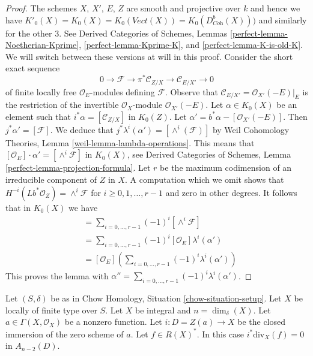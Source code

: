 \begin{proof}
The schemes $X$, $X'$, $E$, $Z$ are smooth and projective over
$k$ and hence we have $K'_0(X) = K_0(X) = K_0(\textit{Vect}(X)) =
K_0(D^b_{\textit{Coh}}(X)))$
and similarly for the other $3$. See
Derived Categories of Schemes, Lemmas \ref{perfect-lemma-Noetherian-Kprime},
\ref{perfect-lemma-Kprime-K}, and \ref{perfect-lemma-K-is-old-K}.
We will switch between these versions at will in this proof.
Consider the short exact sequence
$$
0 \to \mathcal{F} \to \pi^*\mathcal{C}_{Z/X} \to \mathcal{C}_{E/X'} \to 0
$$
of finite locally free $\mathcal{O}_E$-modules defining $\mathcal{F}$.
Observe that $\mathcal{C}_{E/X'} = \mathcal{O}_{X'}(-E)|_E$
is the restriction of the invertible $\mathcal{O}_X$-module
$\mathcal{O}_{X'}(-E)$.
Let $\alpha \in K_0(X)$ be an element such that
$i^*\alpha = [\mathcal{C}_{Z/X}]$ in $K_0(Z)$.
Let $\alpha' = b^*\alpha - [\mathcal{O}_{X'}(-E)]$.
Then $j^*\alpha' = [\mathcal{F}]$. We deduce that
$j^*\lambda^i(\alpha') = [\wedge^i(\mathcal{F})]$ by
Weil Cohomology Theories, Lemma \ref{weil-lemma-lambda-operations}.
This means that $[\mathcal{O}_E] \cdot \alpha' = [\wedge^i\mathcal{F}]$
in $K_0(X)$, see
Derived Categories of Schemes, Lemma \ref{perfect-lemma-projection-formula}.
Let $r$ be the maximum codimension of an irreducible component of $Z$
in $X$. A computation which we omit shows that
$H^{-i}(Lb^*\mathcal{O}_Z) = \wedge^i\mathcal{F}$
for $i \geq 0, 1, \ldots, r - 1$ and zero in other degrees.
It follows that in $K_0(X)$ we have
\begin{align*}
[Lb^*\mathcal{O}_Z] & =
\sum\nolimits_{i = 0, \ldots, r - 1} (-1)^i[\wedge^i\mathcal{F}] \\
& =
\sum\nolimits_{i = 0, \ldots, r - 1} (-1)^i[\mathcal{O}_E] \lambda^i(\alpha') \\
& =
[\mathcal{O}_E] \left(\sum\nolimits_{i = 0, \ldots, r - 1}
(-1)^i \lambda^i(\alpha')\right)
\end{align*}
This proves the lemma with
$\alpha'' = \sum_{i = 0, \ldots, r - 1} (-1)^i \lambda^i(\alpha')$.
\end{proof}



\begin{lemma}
\label{lemma-gysin-factors-principal}
Let $(S, \delta)$ be as in Chow Homology, Situation \ref{chow-situation-setup}.
Let $X$ be locally of finite type over $S$.
Let $X$ be integral and $n = \dim_\delta(X)$.
Let $a \in \Gamma(X, \mathcal{O}_X)$ be a nonzero function.
Let $i : D = Z(a) \to X$ be the closed immersion of the zero scheme of $a$.
Let $f \in R(X)^*$.
In this case $i^*\text{div}_X(f) = 0$ in $A_{n - 2}(D)$.
\end{lemma}


